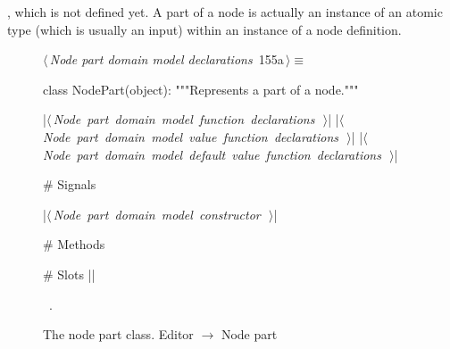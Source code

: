 \documentclass[%
    a4paper,    %
    justified,  %
    nobib,      %
    openany     %
]{tufte-book}
\makeatletter
\renewcommand{\label}[1]{\@tufte@label{##1}}%
\makeatother
\begin{document}
,
which is not defined yet. A part of a node is actually an instance of an atomic
type (which is usually an input) within an instance of a node definition.

\begin{figure}[!htbp]
\begin{flushleft} \small
\begin{minipage}{\linewidth}\label{scrap114}\raggedright\small
{} $\langle\,${\itshape Node part domain model declarations}\nobreak\ {\footnotesize {155a}}$\,\rangle\equiv$
\vspace{-1ex}
\begin{pythoncode}
class NodePart(object):
    """Represents a part of a node."""

    |\hbox{$\langle\,${\itshape Node part domain model function declarations}\nobreak\ {\footnotesize {}}$\,\rangle$}|
    |\hbox{$\langle\,${\itshape Node part domain model value function declarations}\nobreak\ {\footnotesize {}}$\,\rangle$}|
    |\hbox{$\langle\,${\itshape Node part domain model default value function declarations}\nobreak\ {\footnotesize {}}$\,\rangle$}|

    # Signals

    |\hbox{$\langle\,${\itshape Node part domain model constructor}\nobreak\ {\footnotesize {}}$\,\rangle$}|

    # Methods

    # Slots
|\NWsep|
\end{pythoncode}
\vspace{1.5ex}
\footnotesize
\begin{list}{}{\setlength{\itemsep}{-\parsep}\setlength{\itemindent}{-\leftmargin}}
\item \NWtxtMacroRefIn\ .

\item{}
\end{list}
\end{minipage}\vspace{4ex}
\end{flushleft}
\caption{The node part class.
  \newline{}\newline{}Editor $\rightarrow$ Node part}
\end{figure}
\end{document}
